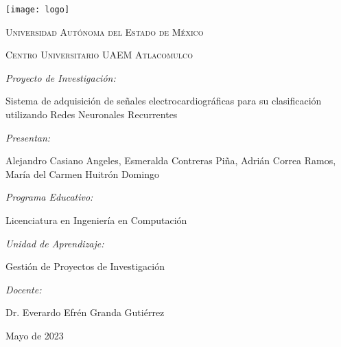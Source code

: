 
\begin{titlepage}
{\setlength{\parskip}{0cm}
\centering
{\texttt{[image: logo]}\par}
\vspace{0.4cm}
{\scshape\Large Universidad Autónoma del Estado de México \par}
\vspace{0.4cm}
{\scshape\Large Centro Universitario UAEM Atlacomulco \par}
\vfill
{\itshape\Large Proyecto de Investigación: \par}

{\Large Sistema de adquisición de señales electrocardiográficas para su clasificación utilizando Redes Neuronales Recurrentes}
\vfill
{\itshape\Large Presentan: \par}

{\Large Alejandro Casiano Angeles, Esmeralda Contreras Piña, Adrián Correa Ramos, María del Carmen Huitrón Domingo\par}
\vfill

{\itshape\Large Programa Educativo: \par}
{\Large Licenciatura en Ingeniería en Computación \par}
\vfill
{\itshape\Large Unidad de Aprendizaje: \par}
{\Large Gestión de Proyectos de Investigación \par}
\vfill
{\itshape\Large Docente: \par}
{\Large Dr. Everardo Efrén Granda Gutiérrez \par}
\vfill
{\Large Mayo de 2023 \par}
}
\end{titlepage} 